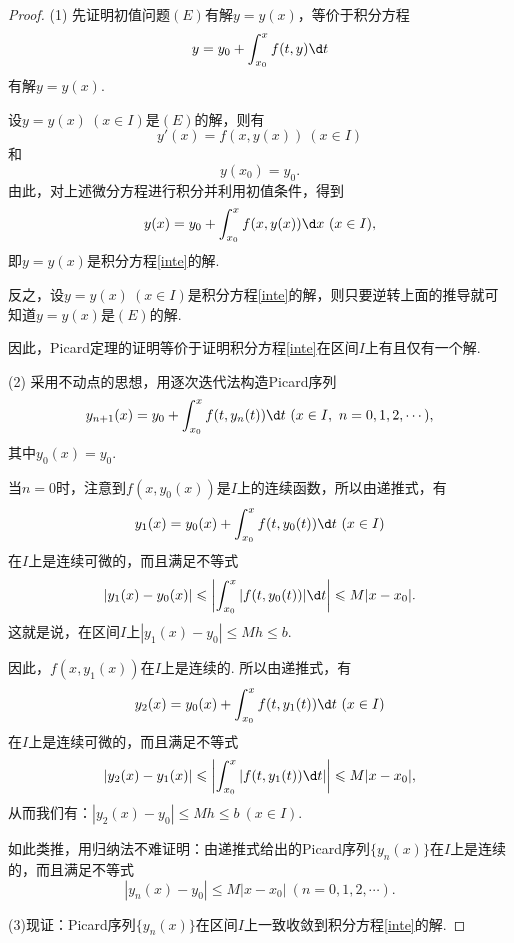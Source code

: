 \documentclass[lang=cn,10pt]{elegantbook}
\begin{document}
\begin{proof}
	(1) 先证明初值问题$(E)$有解$y=y(x)$，等价于积分方程
	\begin{equation}\label{inte}
		y=y_0+\int_{x_0}^{x}f(t,y)\d t
	\end{equation}
	有解$y=y(x)$. 
	
	设$y=y(x)\ (x\in I)$是$(E)$的解，则有
	$$y'(x)=f(x,y(x))\ (x\in I)$$
	和
	$$y(x_0)=y_0.$$
	由此，对上述微分方程进行积分并利用初值条件，得到
	$$y(x)=y_0+\int_{x_0}^{x}f(x,y(x))\d x\ (x\in I),$$
	即$y=y(x)$是积分方程\ref{inte}的解.
	
	反之，设$y=y(x)\ (x\in I)$是积分方程\ref{inte}的解，则只要逆转上面的推导就可知道$y=y(x)$是$(E)$的解.
	
	因此，Picard定理的证明等价于证明积分方程\ref{inte}在区间$I$上有且仅有一个解.
	
	(2) 采用不动点的思想，用逐次迭代法构造Picard序列
	$$y_{n+1}(x)=y_0+\int_{x_0}^{x}f(t,y_n(t))\d t\ (x\in I,\ n=0,1,2,\cdots),$$
	其中$y_0(x)=y_0$.
	
	当$n=0$时，注意到$f(x,y_0(x))$是$I$上的连续函数，所以由递推式，有
	$$y_1(x)=y_0(x)+\int_{x_0}^{x}f(t,y_0(t))\d t\ (x\in I)$$
	在$I$上是连续可微的，而且满足不等式
	$$|y_1(x)-y_0(x)|\leqslant\left|\int_{x_0}^{x}|f(t,y_0(t))|\d t\right|\leqslant M|x-x_0|.$$
	这就是说，在区间$I$上$|y_1(x)-y_0|\leqslant Mh\leqslant b$.
	
	因此，$f(x,y_1(x))$在$I$上是连续的. 所以由递推式，有
	$$y_2(x)=y_0(x)+\int_{x_0}^{x}f(t,y_1(t))\d t\ (x\in I)$$
	在$I$上是连续可微的，而且满足不等式
	$$|y_2(x)-y_1(x)|\leqslant\left|\int_{x_0}^{x}|f(t,y_1(t))\d t|\right|\leqslant M|x-x_0|,$$
	从而我们有：$|y_2(x)-y_0|\leqslant Mh\leqslant b\ (x\in I)$.
	
	如此类推，用归纳法不难证明：由递推式给出的Picard序列$\{y_n(x)\}$在$I$上是连续的，而且满足不等式
	$$|y_n(x)-y_0|\leqslant M|x-x_0|\ (n=0,1,2,\cdots).$$
	
	(3)现证：Picard序列$\{y_n(x)\}$在区间$I$上一致收敛到积分方程\ref{inte}的解.
	

\end{proof}
\end{document}
